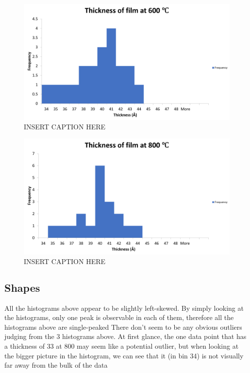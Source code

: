 \documentclass[letterpaper]{article}
\begin{document}
    \begin{figure}[H]
      \centering
      \includegraphics[width=\textwidth]{thicc600.png}
      \caption{INSERT CAPTION HERE}
      \label{thicc600}
    \end{figure}

    \begin{figure}[H]
      \centering
      \includegraphics[width=\textwidth]{thicc800.png}
      \caption{INSERT CAPTION HERE}
      \label{thicc800}
    \end{figure}

  \subsection{Shapes}
    All the histograms above appear to be slightly left-skewed.
    By simply looking at the histograms, only one peak is observable in each of them, therefore all the histograms above are single-peaked
    There don’t seem to be any obvious outliers judging from the 3 histograms above. At first glance, the one data point that has a thickness of 33  at 800  may seem like a potential outlier, but when looking at the bigger picture in the histogram, we can see that it (in bin 34) is not visually far away from the bulk of the data
\end{document}

